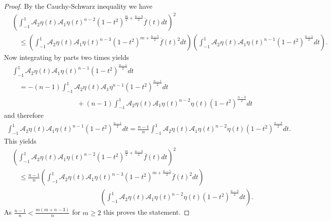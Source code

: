 \documentclass[12pt,twoside]{amsart}
\numberwithin{satz}{section}
\theoremstyle{definition}
\numberwithin{equation}{section}
\begin{document}
	\begin{proof}
		By the Cauchy-Schwarz inequality we have
		\begin{align*}
			&\left(\int_{-1}^1 \mathcal{A}_2\eta(t)\mathcal{A}_1\eta(t)^{n-2}(1-t^2)^{\frac{m}{2}+\frac{n-3}{2}} \overline{f}(t)dt\right)^2  \\
			& \quad \leq \left(\int_{-1}^1 \mathcal{A}_2\eta(t)\mathcal{A}_1\eta(t)^{n-3}(1-t^2)^{m+\frac{n-5}{2}} \overline{f}(t)^2dt\right)\left(\int_{-1}^1 \mathcal{A}_2\eta(t)\mathcal{A}_1\eta(t)^{n-1}(1-t^2)^{\frac{n-1}{2}}dt\right).
		\end{align*}
		Now integrating by parts two times yields
		\begin{align*}
			&\int_{-1}^1 \mathcal{A}_2\eta(t)\mathcal{A}_1\eta(t)^{n-1}(1-t^2)^{\frac{n-1}{2}}dt \\
			& \quad = -(n-1)\int_{-1}^1 \mathcal{A}_2\eta(t)\mathcal{A}_1\eta^{n-1}(1-t^2)^{\frac{n-1}{2}}dt \\
			& \hspace{4cm} + (n-1)\int_{-1}^1 \mathcal{A}_2\eta(t)\mathcal{A}_1\eta(t)^{n-2}\eta(t)(1-t^2)^{\frac{n-3}{2}}dt
		\end{align*}
		and therefore
		\begin{align}\label{equality_Kubota}
			\int_{-1}^1 \mathcal{A}_2\eta(t)\mathcal{A}_1\eta(t)^{n-1}(1-t^2)^{\frac{n-1}{2}}dt=\frac{n-1}{n}\int_{-1}^1 \mathcal{A}_2\eta(t)\mathcal{A}_1\eta(t)^{n-2}\eta(t)(1-t^2)^{\frac{n-3}{2}}dt.
		\end{align}
		This yields
		\begin{align*}
			&\left(\int_{-1}^1 \mathcal{A}_2\eta(t)\mathcal{A}_1\eta(t)^{n-2}(1-t^2)^{\frac{m}{2}+\frac{n-3}{2}} \overline{f}(t)dt\right)^2  \\
			& \quad \leq  \frac{n-1}{n}\left(\int_{-1}^1 \mathcal{A}_2\eta(t)\mathcal{A}_1\eta(t)^{n-3}(1-t^2)^{m+\frac{n-5}{2}} \overline{f}(t)^2dt\right)\\
			& \quad \hspace{5cm}  \left(\int_{-1}^1 \mathcal{A}_2\eta(t)\mathcal{A}_1\eta(t)^{n-2}\eta(t)(1-t^2)^{\frac{n-3}{2}}dt\right).
		\end{align*}
		As $\frac{n-1}{n} < \frac{m(m+n-3)}{n}$ for $m\geq 2$ this proves the statement.
	\end{proof} 
\end{document}

